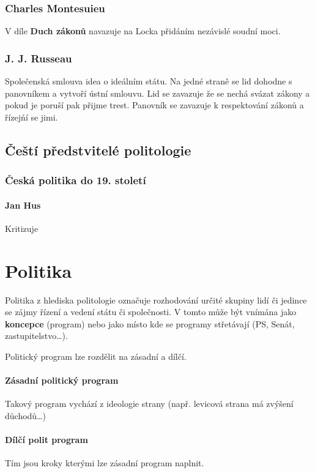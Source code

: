 \documentclass[10pt,a4paper,
twoside,%
]{report}
\begin{document}
\subsubsection{Charles Montesuieu}
 V díle \textbf{Duch zákonů} navazuje na Locka přidáním nezávislé soudní moci.
 
 \subsubsection{J. J. Russeau} \label{russeau}
Společenská smlouva 
 idea o ideálním státu. Na jedné straně se lid dohodne s panovníkem a vytvoří ústní smlouvu. Lid se zavazuje že se nechá svázat zákony a pokud je poruší pak přijme trest. Panovník se zavazuje k respektování zákonů a řízejńí se jimi.

\subsection{Čeští předstvitelé politologie}

\subsubsection{Česká politika do 19. století}
\paragraph{Jan Hus} Kritizuje 

\section{Politika}
Politika z hlediska politologie označuje rozhodování určité skupiny lidí či jedince se zájmy řízení a vedení státu či společnosti. V tomto může být vnímána jako \textbf{koncepce} (program) nebo jako místo kde se programy střetávají (PS, Senát, zastupitelstvo\dots).

Politický program lze rozdělit na zásadní a dílčí.

\paragraph{Zásadní politický program} Takový program vychází z ideologie strany (např. levicová strana má zvýšení důchodů\dots)

\paragraph{Dílčí polit program} Tím jsou kroky kterými lze zásadní program naplnit.
\end{document}
